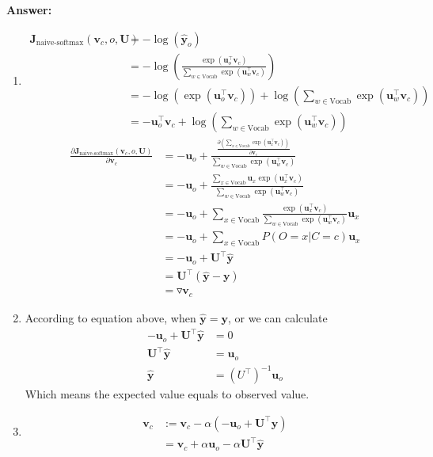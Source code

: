 \documentclass{article}
\newenvironment{answer}{
    {\bf Answer:} \sf \begingroup\color{red}
}{\endgroup}%
\begin{document}
\begin{enumerate}[label=(\alph*)]
\begin{shaded}
\begin{answer}
    \begin{enumerate}[label=(\roman*)]
        \item
        \begin{align*} \label{J transformed}
            \bm J_{\text{naive-softmax}}(\bm v_c, o, \bm U) & = - \log (\hat{\bm y}_o) \\
            & = - \log (\frac{\exp(\bm u_{o}^\top \bm v_c)}{\sum_{w \in \text{Vocab}} \exp(\bm u_{w}^\top \bm v_c)}) \\
            & = - \log (\exp(\bm u_{o}^\top \bm v_c)) + \log (\sum_{w \in \text{Vocab}} \exp(\bm u_{w}^\top \bm v_c)) \\
            & = - \bm u_{o}^\top \bm v_c + \log (\sum_{w \in \text{Vocab}} \exp(\bm u_{w}^\top \bm v_c))
            \tag{$*$}
        \end{align*}
        \color{red}
        \begin{align*}
            \frac{\partial \bm J_{\text{naive-softmax}}(\bm v_c, o, \bm U)}{\partial \bm v_c} & = - \bm u_o + \frac{\frac{\partial (\sum_{x \in \text{Vocab}} \exp(\bm u_{x}^\top \bm v_c))}{\partial \bm v_c}}{\sum_{w \in \text{Vocab}} \exp(\bm u_{w}^\top \bm v_c)} \\
            & = - \bm u_o + \frac{\sum_{x \in \text{Vocab}} \bm u_x \exp(\bm u_{x}^\top \bm v_c)}{\sum_{w \in \text{Vocab}} \exp(\bm u_{w}^\top \bm v_c)} \\
            & = - \bm u_o + \sum_{x \in \text{Vocab}} \frac{\exp(\bm u_{x}^\top \bm v_c)}{\sum_{w \in \text{Vocab}} \exp(\bm u_{w}^\top \bm v_c)} \bm u_x \\
            & = - \bm u_o + \sum_{x \in \text{Vocab}} P(O = x | C = c) \bm u_x \\
            & = - \bm u_o + \bm U^\top \hat{\bm y} \\
            & = \bm U^\top (\hat{\bm y} - \bm y) \\
            & = \triangledown \bm v_c
        \end{align*}
        \item
        According to equation above, when $\hat{\bm y} = \bm y$, or we can calculate
        \begin{align*}
            - \bm u_o + \bm U^\top \hat{\bm y} & = 0 \\
            \bm U^\top \hat{\bm y} & = \bm u_o \\
            \hat{\bm y} & = (U^\top)^{-1} \bm u_o
        \end{align*}
        Which means the expected value equals to observed value.
        \item
        \begin{align*}
            \bm v_c & := \bm v_c - \alpha (- \bm u_o + \bm U^\top \hat{\bm y}) \\
            & = \bm v_c + \alpha \bm u_o - \alpha \bm U^\top \hat{\bm y}
        \end{align*}


\end{enumerate}
\end{answer}
\end{shaded}
\end{enumerate}
\end{document}
